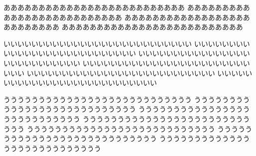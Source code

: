 \begin{bkdblovalbox}
%
ああああああああああああああああああああああああああ
ああああああああああああああああああああああああああ
ああああああああああああああああああああああああああ
ああああああああああああああああああああああああああ

いいいいいいいいいいいいいいいいいいいいいいいいいいい
いいいいいいいいいいいいいいいいいいいいいいいいいいい
いいいいいいいいいいいいいいいいいいいいいいいいいいい
いいいいいいいいいいいいいいいいいいいいいいいいいいい
いいいいいいいいいいいいいいいいいいいいいいいいいいい
いいいいいいいいいいいいいいいいいいいいいいいいいいい

ううううううううううううううううううううううううううう
ううううううううううううううううううううううううううう
ううううううううううううううううううううううううううう
ううううううううううううううううううううううううううう
ううううううううううううううううううううううううううう
ううううううううううううううううううううううううううう
ううううううううううううううううううううううううううう
\end{bkdblovalbox}

